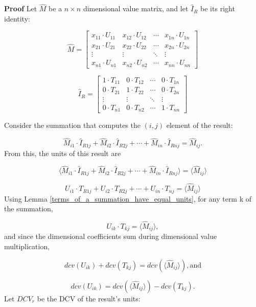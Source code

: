 \documentclass[10pt,letterpaper]{article}
\newenvironment{proof}{\noindent\textbf{Proof} }{\qed \newline}
\newcommand{\qed}{\nobreak \ifvmode \relax \else
      \ifdim\lastskip<1.5em \hskip-\lastskip
      \hskip1.5em plus0em minus0.5em \fi \nobreak
      \vrule height0.75em width0.5em depth0.25em\fi}
\numberwithin{equation}{section}
\begin{document}
\begin{proof}Let $\hat M$ be a $n \times n$ dimensional value matrix,
  and let $\hat I_R$ be its right identity:

\[ \hat M = \left[ \begin{matrix} 
  x_{11} \cdot U_{11} & x_{12} \cdot U_{12} & \cdots & x_{1n} \cdot U_{1n} \\
  x_{21} \cdot U_{21} & x_{22} \cdot U_{22} & \cdots & x_{2n} \cdot U_{2n} \\
  \vdots & \vdots & \ddots & \vdots \\
  x_{n1} \cdot U_{n1} & x_{n2} \cdot U_{n2} & \cdots & x_{nn} \cdot U_{nn}
 \end{matrix} \right] \]

\[ \hat I_R = \left[ \begin{matrix} 
  1 \cdot T_{11} & 0 \cdot T_{12} & \cdots & 0 \cdot T_{1n} \\
  0 \cdot T_{21} & 1 \cdot T_{22} & \cdots & 0 \cdot T_{2n} \\
  \vdots & \vdots & \ddots & \vdots \\
  0 \cdot T_{n1} & 0 \cdot T_{n2} & \cdots & 1 \cdot T_{nn}
 \end{matrix} \right] \]

Consider the summation that computes the $(i, j)$ element of the
result:

\[ \hat M_{i1} \cdot \hat I_{R1j} + \hat M_{i2} \cdot \hat I_{R2j}
+\cdots + \hat M_{in} \cdot \hat I_{Rnj} = \hat M_{ij} . \] From this,
the units of this result are

\[ \langle \hat M_{i1} \cdot \hat I_{R1j} + \hat M_{i2} \cdot \hat
I_{R2j} +\cdots + \hat M_{in} \cdot \hat I_{Rnj} \rangle = \langle
\hat M_{ij} \rangle \]

\[ U_{i1} \cdot T_{R1j} + U_{i2} \cdot T_{R2j} +\cdots + U_{in} \cdot
T_{nj} = \langle \hat M_{ij} \rangle \] Using Lemma
\ref{terms_of_a_summation_have_equal_units}, for any term k of the
summation,

\[ U_{ik} \cdot T_{kj} = \langle \hat M_{ij} \rangle , \] and since
the dimensional coefficients sum during dimensional value
multiplication,

\begin{equation} \label{basic_equation_1_for_right_identity_ddv_proof}
  dcv(U_{ik}) + dcv(T_{kj}) = dcv( \langle \hat M_{ij} \rangle ) ,
  \mbox{and} \end{equation}

\begin{equation} \label{basic_equation_2_for_right_identity_ddv_proof}
  dcv(U_{ik}) = dcv( \langle \hat M_{ij} \rangle ) -
  dcv(T_{kj}). \end{equation} Let $DCV_r$ be the DCV of the result's
units:


\end{proof}
\end{document}
